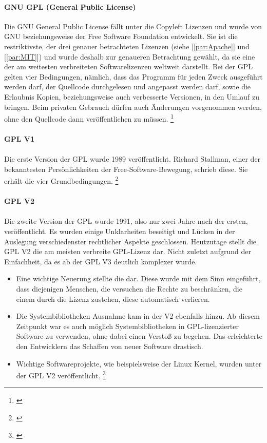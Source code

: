 \documentclass[titlepage,12pt,twoside]{article}
\begin{document}
\paragraph{GNU GPL (General Public License)}
\hfill \break
\hfill \break
Die GNU General Public License fällt unter die Copyleft Lizenzen und wurde von GNU beziehungsweise der Free 
Software Foundation entwickelt. Sie ist die restriktivste, der drei genauer betrachteten Lizenzen (siehe [\textcolor{blue}{\autoref{par:Apache}}] und [\textcolor{blue}{\autoref{par:MIT}}]) 
und wurde deshalb zur genaueren Betrachtung gewählt, da sie eine der am weitesten verbreiteten Softwarelizenzen weltweit darstellt. Bei der GPL gelten vier Bedingungen, nämlich, dass das Programm für jeden Zweck 
ausgeführt werden darf, der Quellcode durchgelesen und angepasst werden darf, sowie die Erlaubnis Kopien, 
beziehungsweise auch verbesserte Versionen, in den Umlauf zu bringen. Beim privaten Gebrauch dürfen auch 
Änderungen vorgenommen werden, ohne den Quellcode dann veröffentlichen zu müssen. \footnote{\cite{WikipediaGPL}} \\
\\
\textbf{GPL V1} \\
\\
Die erste Version der GPL wurde 1989 veröffentlicht. Richard Stallman, einer der bekanntesten 
Persönlichkeiten der Free-Software-Bewegung, schrieb diese. Sie erhält die vier Grundbedingungen. \footnote{\cite{WikipediaGPL3}} \\
\\
\textbf{GPL V2} \\
\\
Die zweite Version der GPL wurde 1991, also nur zwei Jahre nach der ersten, veröffentlicht. Es wurden einige 
Unklarheiten beseitigt und Lücken in der Auslegung verschiedenster rechtlicher Aspekte geschlossen. 
Heutzutage stellt die GPL V2 die am meisten verbreite GPL-Lizenz dar. Nicht zuletzt aufgrund der Einfachheit, 
da es ab der GPL V3 deutlich komplexer wurde. \\
\begin{itemize}
	\item Eine wichtige Neuerung stellte die  dar. Diese wurde mit dem Sinn 
	eingeführt, dass diejenigen Menschen, die versuchen die Rechte zu beschränken, die einem durch die 
	Lizenz zustehen, diese automatisch verlieren.
	\item Die Systembibliotheken Ausnahme kam in der V2 ebenfalls hinzu. Ab diesem Zeitpunkt war es auch 
	möglich Systembibliotheken in GPL-lizenzierter Software zu verwenden, ohne dabei einen Verstoß zu begehen. 
	Das erleichterte den Entwicklern das Schaffen von neuer Software drastisch.
	\item Wichtige Softwareprojekte, wie beispielsweise der Linux Kernel, wurden unter der GPL V2 
	veröffentlicht. \footnote{\cite{WikipediaGPL3}}
\end{itemize}
\end{document}

